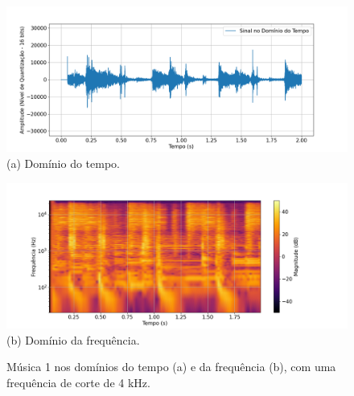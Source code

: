 \begin{figure}[htpb]
    \centering
    \begin{minipage}[b]{0.7\textwidth}
        \centering
        \includegraphics[width=\textwidth]{figuras/fig26.png}
        \vspace{0.3cm} %
        (a) Domínio do tempo.
    \end{minipage}
    \hspace{0.5cm} %

    \begin{minipage}[b]{0.7\textwidth}
        \centering
        \includegraphics[width=\textwidth]{figuras/fig27.png}
        \vspace{0.3cm} %
        (b) Domínio da frequência.
    \end{minipage}

    \caption{Música 1 nos domínios do tempo (a) e da frequência (b), com uma frequência de corte de 4 kHz.}
    \label{fig26}
\end{figure}

